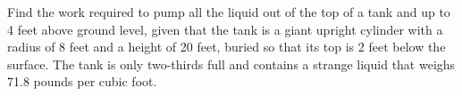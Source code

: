 \documentclass[12pt, addpoints]{exam/exam}
\newcommand{\1}{^{-1}}
\theoremstyle{plain}
\begin{document}
\begin{questions}
\newpage
\question[18] %
Find the work required to pump all the liquid out of the top of a tank and up to 4 feet above ground level, given that the tank is a giant upright cylinder with a radius of 8 feet and a height of 20 feet, buried so that its top is 2 feet below the surface.  The tank is only two-thirds full and contains a strange liquid that weighs 71.8 pounds per cubic foot.

\end{questions}
\end{document}
